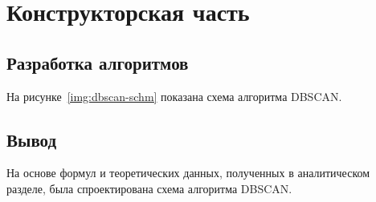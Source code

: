 \chapter{Конструкторская часть}

\section{Разработка алгоритмов}

На рисунке~\ref{img:dbscan-schm} показана схема алгоритма DBSCAN. 

\section*{Вывод}

На основе формул и теоретических данных, полученных в аналитическом разделе, была спроектирована схема алгоритма DBSCAN.